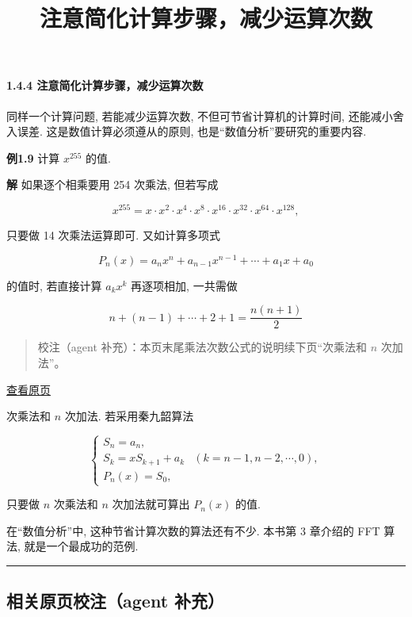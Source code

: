 \documentclass[
  10pt,
  fontset=fandol]{ctexart}
\title{注意简化计算步骤，减少运算次数}
\author{}
\date{}
\begin{document}
\maketitle

\paragraph{1.4.4 注意简化计算步骤，减少运算次数}\label{ux6ce8ux610fux7b80ux5316ux8ba1ux7b97ux6b65ux9aa4ux51cfux5c11ux8fd0ux7b97ux6b21ux6570}

同样一个计算问题, 若能减少运算次数, 不但可节省计算机的计算时间, 还能减小舍入误差. 这是数值计算必须遵从的原则, 也是``数值分析''要研究的重要内容.

\textbf{例1.9} 计算 \(x^{255}\) 的值.

\textbf{解} 如果逐个相乘要用 254 次乘法, 但若写成

\[
x^{255} = x \cdot x^2 \cdot x^4 \cdot x^8 \cdot x^{16} \cdot x^{32} \cdot x^{64} \cdot x^{128},
\]

只要做 14 次乘法运算即可. 又如计算多项式

\[
P_n(x) = a_n x^n + a_{n-1} x^{n-1} + \cdots + a_1 x + a_0
\]

的值时, 若直接计算 \(a_k x^k\) 再逐项相加, 一共需做

\[
n + (n-1) + \cdots + 2 + 1 = \frac{n(n+1)}{2}
\]

\begin{quote}
校注（agent 补充）：本页末尾乘法次数公式的说明续下页``次乘法和 \(n\) 次加法''。
\end{quote}

\href{../../source-images/pdf-025.jpeg}{查看原页}

次乘法和 \(n\) 次加法. 若采用秦九韶算法

\[
\begin{cases} S_n = a_n, \\ S_k = xS_{k+1} + a_k & (k=n-1,n-2,\cdots,0), \\ P_n(x) = S_0, \end{cases} \tag{1.4.1}
\]

只要做 \(n\) 次乘法和 \(n\) 次加法就可算出 \(P_n(x)\) 的值.

在``数值分析''中, 这种节省计算次数的算法还有不少. 本书第 3 章介绍的 FFT 算法, 就是一个最成功的范例.

\begin{center}\rule{0.5\linewidth}{0.5pt}\end{center}

\subsection{相关原页校注（agent 补充）}\label{ux76f8ux5173ux539fux9875ux6821ux6ce8agent-ux8865ux5145}
\end{document}
